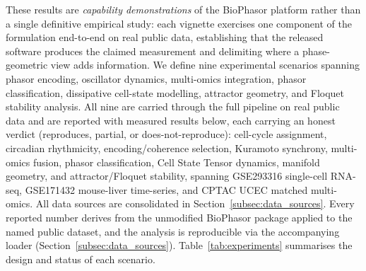 \documentclass[preprint,12pt,amsmath,amssymb,superscriptaddress,floatfix]{revtex4-2}
\begin{document}
These results are \emph{capability demonstrations} of the BioPhasor platform
rather than a single definitive empirical study: each vignette exercises one
component of the formulation end-to-end on real public data, establishing that
the released software produces the claimed measurement and delimiting where a
phase-geometric view adds information. We define nine experimental scenarios
spanning phasor encoding, oscillator dynamics, multi-omics integration, phasor
classification, dissipative cell-state modelling, attractor geometry, and Floquet
stability analysis. All nine are carried through the full pipeline on real public
data and are reported with measured results below, each carrying an honest verdict
(reproduces, partial, or does-not-reproduce): cell-cycle assignment, circadian
rhythmicity, encoding/coherence selection, Kuramoto synchrony, multi-omics
fusion, phasor classification, Cell State Tensor dynamics, manifold geometry,
and attractor/Floquet stability, spanning GSE293316 single-cell RNA-seq,
GSE171432 mouse-liver time-series, and CPTAC UCEC matched multi-omics. All
data sources are consolidated in Section~\ref{subsec:data_sources}. Every
reported number derives from the
unmodified BioPhasor package applied to the named public dataset, and the
analysis is reproducible via the accompanying loader
(Section~\ref{subsec:data_sources}). Table~\ref{tab:experiments} summarises
the design and status of each scenario.
\end{document}
